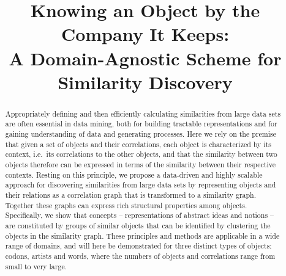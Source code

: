 \documentclass[conference]{IEEEtran}
\begin{document}
\title{Knowing an Object by the Company It Keeps:\\A Domain-Agnostic Scheme for Similarity Discovery}

\author{
\and
{}
\and
{}
}

\maketitle

\begin{abstract}
Appropriately defining and then efficiently calculating similarities from large data sets are often essential
in data mining, both for building tractable representations and for gaining understanding of data and generating processes.
Here we rely on the premise that given a set of objects and their correlations, each object is characterized
by its context, i.e.\ its correlations to the other objects, and that the similarity between two objects therefore can be 
expressed in terms of the similarity between their respective contexts.
Resting on this principle, we propose a data-driven and highly scalable approach for discovering
similarities from large data sets by representing objects and their relations as a correlation graph that is
transformed to a similarity graph. Together these graphs can express rich structural properties
among objects. Specifically, we show that concepts -- representations of 
abstract ideas and notions -- are constituted by groups of similar objects that can be identified
by clustering the objects in the similarity graph.
These principles and methods are applicable in a wide range of domains, and will here be demonstrated 
for three distinct types of objects: codons, artists and words, where the numbers of objects and correlations
range from small to very large.
\end{abstract}
\end{document}
